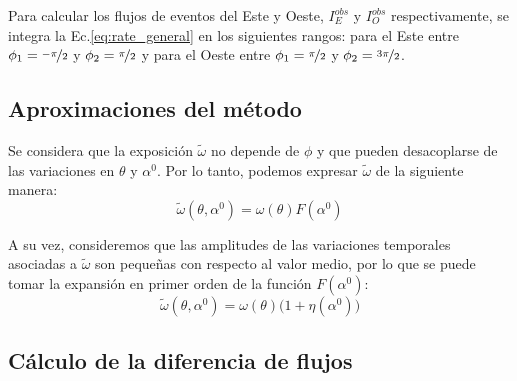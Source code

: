     Para calcular los flujos de eventos del Este y Oeste, $I^{obs}_E$ y $I_O^{obs}$ respectivamente, se integra la Ec.\ref{eq:rate_general} en los siguientes  rangos: para el Este entre $\phi_1=\nicefrac{-\pi}{2}$ y $\phi_2=\nicefrac{\pi}{2}$ y para el Oeste entre $\phi_1=\nicefrac{\pi}{2}$ y $\phi_2=\nicefrac{3\pi}{2}$.

    \subsection{Aproximaciones del método}
    Se considera que la exposición $\tilde{\omega}$ no depende de $\phi$ y que pueden  desacoplarse de las variaciones en $\theta$ y $\alpha^0$. Por lo tanto, podemos expresar $\tilde{\omega}$ de la siguiente manera:
    \begin{equation}
        \tilde{\omega}(\theta, \alpha^0) = \omega(\theta)F(\alpha^0)
    \end{equation}    
    
    A su vez, consideremos que las amplitudes de las variaciones temporales asociadas a $\tilde{\omega}$ son pequeñas con respecto al valor medio, por lo que se puede tomar la expansión en primer orden de la función $F(\alpha^0)$:
    \begin{equation}
        \tilde{\omega}(\theta, \alpha^0) = \omega(\theta)\big(1 + \eta(\alpha^0) \big)
        \label{eq:omega_expandido}
    \end{equation}
    \subsection{Cálculo de la diferencia de flujos}
  
